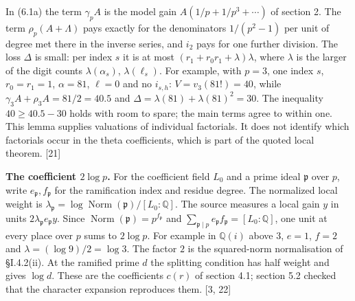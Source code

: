 \documentclass[11pt,letterpaper]{article}
\begin{document}
{In (6.1a) the term $\gamma_pA$ is the model gain $A(1/p+1/p^3+\cdots)$ of section 2. The term $\rho_p(A+\Lambda)$ pays exactly for the denominators $1/(p^2-1)$ per unit of degree met there in the inverse series, and $i_2$ pays for one further division. The loss $\Delta$ is small: per index $s$ it is at most $(r_1+r_0r_1+\lambda)\lambda$, where $\lambda$ is the larger of the digit counts $\lambda(\alpha_s)$, $\lambda(\ell_s)$. For example, with $p=3$, one index $s$, $r_0=r_1=1$, $\alpha=81$, $\ell=0$ and no $i_{s,h}$: $V=v_3(81!)=40$, while $\gamma_3A+\rho_3A=81/2=40.5$ and $\Delta=\lambda(81)+\lambda(81)^2=30$. The inequality $40\ge40.5-30$ holds with room to spare; the main terms agree to within one. This lemma supplies valuations of individual factorials. It does not identify which factorials occur in the theta coefficients, which is part of the quoted local theorem. [21]

\textbf{The coefficient $2\log p$.} For the coefficient field $L_0$ and a prime ideal $\mathfrak p$ over $p$, write $e_{\mathfrak p},f_{\mathfrak p}$ for the ramification index and residue degree. The normalized local weight is $\lambda_{\mathfrak p}=\log \operatorname{Norm}(\mathfrak p)/[L_0:\mathbb Q]$. The source measures a local gain $y$ in units $2\lambda_{\mathfrak p}e_{\mathfrak p}y$. Since $\operatorname{Norm}(\mathfrak p)=p^{f_{\mathfrak p}}$ and $\sum_{\mathfrak p\mid p}e_{\mathfrak p}f_{\mathfrak p}=[L_0:\mathbb Q]$, one unit at every place over $p$ sums to $2\log p$. For example in $\mathbb Q(i)$ above $3$, $e=1$, $f=2$ and $\lambda=(\log9)/2=\log3$. The factor $2$ is the squared-norm normalisation of \S I.4.2(ii). At the ramified prime $d$ the splitting condition has half weight and gives $\log d$. These are the coefficients $c(r)$ of section 4.1; section 5.2 checked that the character expansion reproduces them. [3, 22]

}
\end{document}

